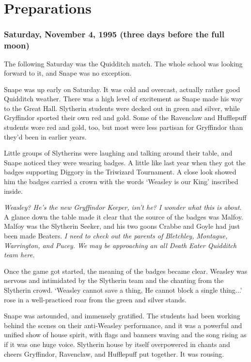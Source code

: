 
\chapter{Preparations}

\subsection{Saturday, November 4, 1995 (three days before the full moon)}

The following Saturday was the Quidditch match. The whole school was looking forward to it, and Snape was no exception.

Snape was up early on Saturday. It was cold and overcast, actually rather good Quidditch weather. There was a high level of excitement as Snape made his way to the Great Hall. Slytherin students were decked out in green and silver, while Gryffindor sported their own red and gold. Some of the Ravenclaw and Hufflepuff students wore red and gold, too, but most were less partisan for Gryffindor than they'd been in earlier years.

Little groups of Slytherins were laughing and talking around their table, and Snape noticed they were wearing badges. A little like last year when they got the badges supporting Diggory in the Triwizard Tournament. A close look showed him the badges carried a crown with the words `Weasley is our King' inscribed inside.

\emph{Weasley? He's the new Gryffindor Keeper, isn't he? I wonder what this is about.} A glance down the table made it clear that the source of the badges was Malfoy. Malfoy was the Slytherin Seeker, and his two goons Crabbe and Goyle had just been made Beaters. \emph{I need to check out the parents of Bletchley, Montague, Warrington, and Pucey. We may be approaching an all Death Eater Quidditch team here.}

Once the game got started, the meaning of the badges became clear. Weasley was nervous and intimidated by the Slytherin team and the chanting from the Slytherin crowd. `Weasley cannot save a thing, He cannot block a single thing...' rose in a well-practiced roar from the green and silver stands.

Snape was astounded, and immensely gratified. The students had been working behind the scenes on their anti-Weasley performance, and it was a powerful and unified show of house spirit, with flags and banners waving and the song rising as if it was one huge voice. Slytherin house by itself overpowered in chants and cheers Gryffindor, Ravenclaw, and Hufflepuff put together. It was rousing.

